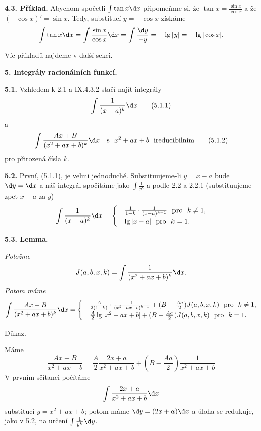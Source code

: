 \documentclass[12pt]{article}
\begin{document}
{ \bigskip
 
 {\bf 4.3. Příklad.} Abychom spočetli $\int \tan x\d x$ připomeňme si, že
 $\tan x=\frac{\sin x}{\cos x}$ a že $(-\cos x)'=\sin x$. Tedy, substitucí $y=-\cos x$ získáme
 $$
 \int\tan x\d x=\int\frac{\sin x}{\cos x}\d x=\int \frac{\d y}{-y}=
 -\lg|y|=-\lg|\cos x|.
 $$
 
 \bigskip
 
 Víc příkladů najdeme v další sekci.
 
  
 \vskip10mm
 
 {\large\bf 5. Integrály racionálních funkcí.}
 
  
 \bigskip
 
 {\bf 5.1.} Vzhledem k 2.1 a IX.4.3.2 stačí najít integrály
 \begin{equation}
 \int\frac{1}{(x-a)^k}\d x \tag{5.1.1}
\end{equation}
 a
\begin{equation}
 \int\frac{Ax+B}{(x^2+ax+b)^k}\d x\quad\text{s}\ \ x^2+ax+b\ \ \text{ireducibilním}  \tag{5.1.2}
 \end{equation}
 pro přirozená čísla $k$.
 
 \bigskip
 
 
 
 {\bf 5.2.} První, (5.1.1), je velmi jednoduché. Substituujeme-li $y=x-a$ bude $\d y=\d x$ a náš integrál spočítáme jako 
 $\int\frac{1}{y^k}$ a podle 2.2 a 2.2.1  (substituujeme zpet $x-a$ za $y$)
 $$
    \int\frac{1}{(x-a)^k}\d x=\begin{cases}&\frac{1}{1-k}\cdot\frac{1}{(x-a)^{k-1}}\ \ \text{pro}\ \ k\neq 1,\\
    &\lg|x-a|\ \ \text{pro}\ \ k=1.
  \end{cases}
  $$
  \bigskip
  
  {\bf 5.3. Lemma.} {\em Položme
  $$
  J(a,b,x,k)=\int\frac{1}{(x^2+ax+b)^k}\d x.
  $$
  Potom máme
 $$
    \int\frac{Ax+B}{(x^2+ax+b)^k}\d x=\begin{cases}&\frac{A}{2(1-k)}\cdot\frac{1}{(x^2+ax+b)^{k-1}}+(B-\frac{Aa}{2})J(a,b,x,k)\ \ \text{pro}\ \ k\neq 1,\\
    &\frac{A}{2}\lg|x^2+ax+b|+(B-\frac{Aa}{2})J(a,b,x,k)\ \ \text{pro}\ \ k=1.
  \end{cases}
  $$
  
  Důkaz.} Máme
  $$
  \frac{Ax+B}{x^2+ax+b}=\frac{A}{2}\frac{2x+a}{x^2+ax+b}+(B-\frac{Aa}{2})\frac{1}{x^2+ax+b}
  $$
  V prvním sčítanci počítáme
  $$
  \int\frac{2x+a}{x^2+ax+b}\d x
		$$
		substitucí $y=x^2+ax+b$; potom máme $\d y =(2x+a)\d x$ a úloha se redukuje, jako v 5.2, na určení $\int\frac{1}{y^k}\d y$.\sq
  
}
\end{document}
